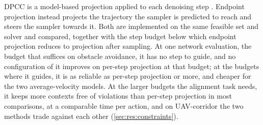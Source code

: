 \begin{enumerate}
    DPCC is a model-based projection applied to each denoising step \parencite{romer2025diffusion}.
    Endpoint projection \parencite{li2025hardflow} instead projects the trajectory the sampler is
    predicted to reach and steers the sampler towards it. Both are implemented on the same feasible set
    and solver and compared, together with the step budget below which endpoint projection reduces to
    projection after sampling. At one network evaluation, the budget that suffices on obstacle
    avoidance, it has no step to guide, and no configuration of it improves on per-step projection at
    that budget; at the budgets where it guides, it is as reliable as per-step projection or more, and
    cheaper for the two average-velocity models. At the larger budgets the alignment task needs, it
    keeps more contexts free of violations than per-step projection in most comparisons, at a
    comparable time per action, and on UAV-corridor the two methods trade against each other
    (\autoref{sec:res:constraints}).
\end{enumerate}

